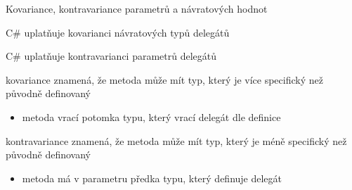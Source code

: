 \begin{frame}[fragile]
\vfill
\begin{bitemize}{Kovariance, kontravariance parametrů a návratových hodnot}
\item C\# uplatňuje kovarianci návratových typů delegátů
\item C\# uplatňuje kontravarianci parametrů delegátů
\end{bitemize}
\vfill
\begin{bitemize}{}
\item kovariance znamená, že metoda může mít typ, který je více specifický než původně definovaný 
\begin{itemize}
\item metoda vrací potomka typu, který vrací delegát dle definice
\end{itemize}

\item kontravariance znamená, že metoda může mít typ, který je méně specifický než původně definovaný
\begin{itemize}
\item metoda má v parametru předka typu, který definuje delegát
\end{itemize}

\end{bitemize}
\vfill
\end{frame}





